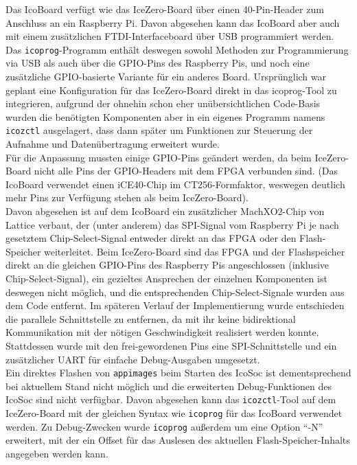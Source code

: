 {Das IcoBoard verfügt wie das IceZero-Board über einen 40-Pin-Header zum Anschluss an ein Raspberry Pi. Davon abgesehen kann das IcoBoard aber auch mit einem zusätzlichen FTDI-Interfaceboard über USB programmiert werden. Das {\tt icoprog}-Programm enthält deswegen sowohl Methoden zur Programmierung via USB als auch über die GPIO-Pins des Raspberry Pis, und noch eine zusätzliche GPIO-basierte Variante für ein anderes Board. Ursprünglich war geplant eine Konfiguration für das IceZero-Board direkt in das icoprog-Tool zu integrieren, aufgrund der ohnehin schon eher unübersichtlichen Code-Basis wurden die benötigten Komponenten aber in ein eigenes Programm namens {\tt icozctl} ausgelagert, dass dann später um Funktionen zur Steuerung der Aufnahme und Datenübertragung erweitert wurde.\\ 
Für die Anpassung mussten einige GPIO-Pins geändert werden, da beim IceZero-Board nicht alle Pins der GPIO-Headers mit dem FPGA verbunden sind. (Das IcoBoard verwendet einen iCE40-Chip im CT256-Formfaktor, weswegen deutlich mehr Pins zur Verfügung stehen als beim IceZero-Board\cite{web:trenz_icoboard}).\\
Davon abgesehen ist auf dem IcoBoard ein zusätzlicher MachXO2-Chip von Lattice verbaut, der (unter anderem) das SPI-Signal vom Raspberry Pi je nach gesetztem Chip-Select-Signal entweder direkt an das FPGA oder den Flash-Speicher weiterleitet. Beim IceZero-Board sind das FPGA und der Flashspeicher direkt an die gleichen GPIO-Pins des Raspberry Pis angeschlossen (inklusive Chip-Select-Signal), ein gezieltes Ansprechen der einzelnen Komponenten ist deswegen nicht möglich, und die entsprechenden Chip-Select-Signale wurden aus dem Code entfernt. 
Im späteren Verlauf der Implementierung wurde entschieden die parallele Schnittstelle zu entfernen, da mit ihr keine bidirektional Kommunikation mit der nötigen Geschwindigkeit realisiert werden konnte. Stattdessen wurde mit den frei-gewordenen Pins eine SPI-Schnittstelle und ein zusätzlicher UART für einfache Debug-Ausgaben umgesetzt.\\
Ein direktes Flashen von {\tt appimages} beim Starten des IcoSoc ist dementsprechend bei aktuellem Stand nicht möglich und die erweiterten Debug-Funktionen des IcoSoc sind nicht verfügbar. 
Davon abgesehen kann das {\tt icozctl}-Tool auf dem IceZero-Board mit der gleichen Syntax wie {\tt icoprog} für das IcoBoard verwendet werden.
Zu Debug-Zwecken wurde {\tt icoprog} außerdem um eine Option ``-N'' erweitert, mit der ein Offset für das Auslesen des aktuellen Flash-Speicher-Inhalts angegeben werden kann.

}
